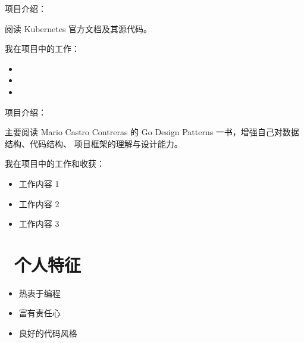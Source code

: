 \documentclass{resume}
\begin{document}

\vspace{1mm}\par
\noindent
项目介绍：

\vspace{1mm}\par
\setlength{\parindent}{2ex}
阅读 Kubernetes 官方文档及其源代码。

\vspace{1mm}\par
\noindent
我在项目中的工作：

\begin{itemize}[parsep=1ex]
  \item 
  \item 
  \item 
\end{itemize}


\vspace{1mm}\par
\noindent
项目介绍：

\vspace{1mm}\par
\setlength{\parindent}{2ex}
主要阅读 Mario Castro Contreras 的 Go Design Patterns 一书，增强自己对数据结构、代码结构、
项目框架的理解与设计能力。

\vspace{1mm}\par
\noindent

我在项目中的工作和收获：
\begin{itemize}[parsep=1ex]
  \item 工作内容 1
  \item 工作内容 2
  \item 工作内容 3
\end{itemize}

\section{\faUser\ 个人特征} \vspace{1mm}

\begin{itemize}[parsep=1ex]
  \item 热衷于编程
  \item 富有责任心
  \item 良好的代码风格
\end{itemize}
\end{document}
